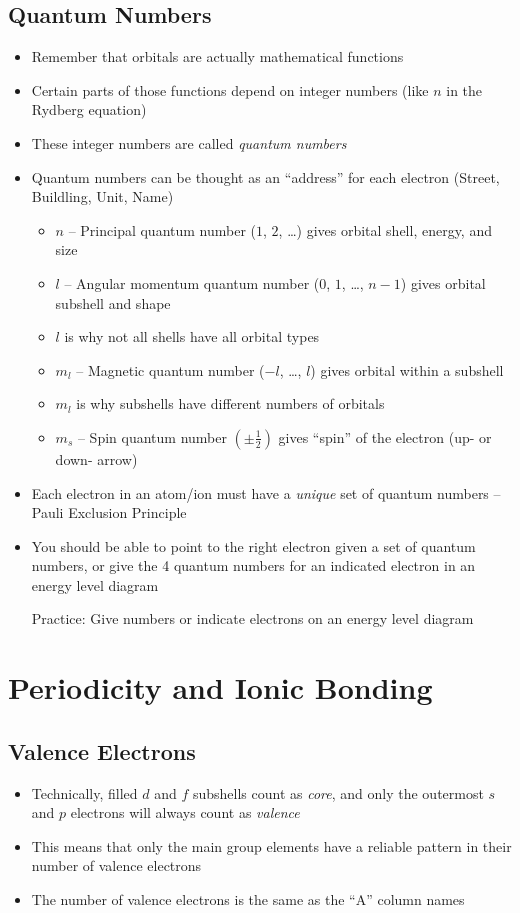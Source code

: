 \documentclass[12pt, openany, letterpaper]{memoir}
\begin{document}
\section{Quantum Numbers}
\begin{itemize}
	\item Remember that orbitals are actually mathematical functions
	\item Certain parts of those functions depend on integer numbers (like $n$ in the Rydberg equation)
	\item These integer numbers are called \emph{quantum numbers}
	\item Quantum numbers can be thought as an ``address'' for each electron (Street, Buildling, Unit, Name)
	      \begin{itemize}
		      \item $n$ -- Principal quantum number ($1$, $2$, \ldots) gives orbital shell, energy, and size
		      \item $l$ -- Angular momentum quantum number ($0$, $1$, \ldots, $n-1$) gives orbital subshell and shape
		      \item $l$ is why not all shells have all orbital types
		      \item $m_l$ -- Magnetic quantum number ($-l$, \ldots, $l$) gives orbital within a subshell
		      \item $m_l$ is why subshells have different numbers of orbitals
		      \item $m_s$ -- Spin quantum number $\left(\pm \frac{1}{2}\right)$ gives ``spin'' of the electron (up- or down- arrow)
	      \end{itemize}
	\item Each electron in an atom/ion must have a \emph{unique} set of quantum numbers -- Pauli Exclusion Principle
	\item You should be able to point to the right electron given a set of quantum numbers, or give the 4 quantum numbers for an indicated electron in an energy level diagram

	      Practice: Give numbers or indicate electrons on an energy level diagram
\end{itemize}

\chapter{Periodicity and Ionic Bonding}
\section{Valence Electrons}
\begin{itemize}
	\item Technically, filled $d$ and $f$ subshells count as \emph{core}, and only the outermost $s$ and $p$ electrons will always count as \emph{valence}
	\item This means that only the main group elements have a reliable pattern in their number of valence electrons
	\item The number of valence electrons is the same as the ``A'' column names
\end{itemize}
\end{document}
